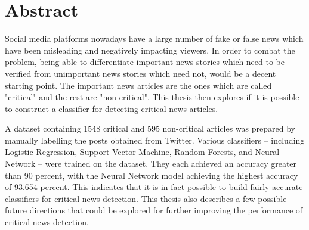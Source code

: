 \chapter*{Abstract}
\makeabstract

Social media platforms nowadays have a large number of fake or false news which have been misleading and negatively impacting viewers. In order to combat the problem, being able to differentiate important news stories which need to be verified from unimportant news stories which need not, would be a decent starting point. The important news articles are the ones which are called "critical" and the rest are "non-critical". This thesis then explores if it is possible to construct a classifier for detecting critical news articles.

A dataset containing 1548 critical and 595 non-critical articles was prepared by manually labelling the posts obtained from Twitter. Various classifiers -- including Logistic Regression, Support Vector Machine, Random Forests, and Neural Network -- were trained on the dataset. They each achieved an accuracy greater than 90 percent, with the Neural Network model achieving the highest accuracy of 93.654 percent. This indicates that it is in fact possible to build fairly accurate classifiers for critical news detection. This thesis also describes a few possible future directions that could be explored for further improving the performance of critical news detection.

\clearpage

\abstractsig
